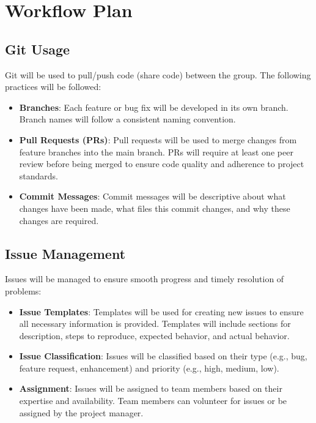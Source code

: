 \documentclass{article}
\begin{document}
\section{Workflow Plan}

\subsection{Git Usage}
Git will be used to pull/push code (share code) between the group. The following practices will be followed:
\begin{itemize}
  \item \textbf{Branches}: Each feature or bug fix will be developed in its own branch. Branch names will follow a consistent naming convention.
  \item \textbf{Pull Requests (PRs)}: Pull requests will be used to merge changes from feature branches into the main branch. PRs will require at least one peer review before being merged to ensure code quality and adherence to project standards.
  \item \textbf{Commit Messages}: Commit messages will be descriptive about what changes have been made, what files this commit changes, and why these changes are required.
\end{itemize}

\subsection{Issue Management}
Issues will be managed to ensure smooth progress and timely resolution of problems:
\begin{itemize}
    \item \textbf{Issue Templates}: Templates will be used for creating new issues to ensure all necessary information is provided. Templates will include sections for description, steps to reproduce, expected behavior, and actual behavior.
    \item \textbf{Issue Classification}: Issues will be classified based on their type (e.g., bug, feature request, enhancement) and priority (e.g., high, medium, low).
    \item \textbf{Assignment}: Issues will be assigned to team members based on their expertise and availability. Team members can volunteer for issues or be assigned by the project manager.
\end{itemize}
\end{document}
